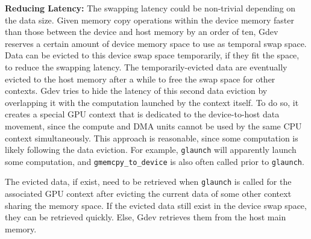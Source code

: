 \textbf{Reducing Latency:}
The swapping latency could be non-trivial depending on the data size.
Given memory copy operations within the device memory faster than
those between the device and host memory by an order of ten, Gdev
reserves a certain amount of device memory space to use as temporal swap
space.
Data can be evicted to this device swap space temporarily, if they fit
the space, to reduce the swapping latency.
The temporarily-evicted data are eventually evicted to the host memory
after a while to free the swap space for other contexts.
Gdev tries to hide the latency of this second data eviction by
overlapping it with the computation launched by the context itself.
To do so, it creates a special GPU context that is dedicated to the
device-to-host data movement, since the compute and DMA units cannot be
used by the same CPU context simultaneously.
This approach is reasonable, since some computation is likely following
the data eviction.
For example, \texttt{glaunch} will apparently launch some computation, and
\texttt{gmemcpy\_to\_device} is also often called prior to \texttt{glaunch}.


The evicted data, if exist, need to be retrieved when \texttt{glaunch}
is called for the associated GPU context after evicting the current data
of some other context sharing the memory space.
If the evicted data still exist in the device swap space, they can be
retrieved quickly.
Else, Gdev retrieves them from the host main memory.
